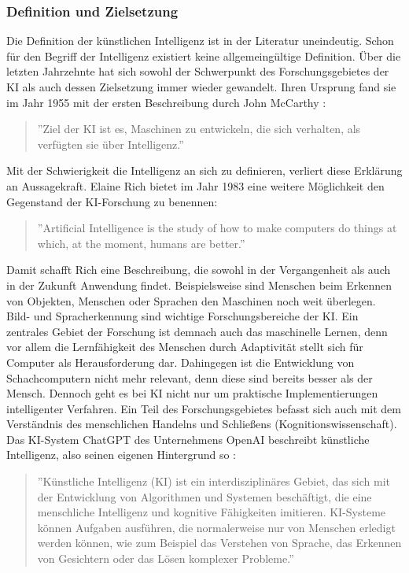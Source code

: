 \documentclass[a4paper,12pt, german]{report}
\begin{document}
\subsubsection{Definition und Zielsetzung}
Die Definition der künstlichen Intelligenz ist in der Literatur uneindeutig. Schon für den Begriff der Intelligenz existiert keine allgemeingültige Definition. Über die letzten Jahrzehnte hat sich sowohl der Schwerpunkt des Forschungsgebietes der KI als auch dessen Zielsetzung immer wieder gewandelt. Ihren Ursprung fand sie im Jahr 1955 mit der ersten Beschreibung durch John McCarthy \cite{11}:
\begin{quote}
  ''Ziel der KI ist es, Maschinen zu entwickeln, die sich verhalten, als verfügten sie über Intelligenz.''
\end{quote}
Mit der Schwierigkeit die Intelligenz an sich zu definieren, verliert diese Erklärung an Aussagekraft. Elaine Rich bietet im Jahr 1983 eine weitere Möglichkeit den Gegenstand der KI-Forschung zu benennen: 

\begin{quote}
''Artificial Intelligence is the study of how to make computers do things at which, at the moment, humans are better.''
\end{quote} 
Damit schafft Rich eine Beschreibung, die sowohl in der Vergangenheit als auch in der Zukunft Anwendung findet. Beispielsweise sind Menschen beim Erkennen von Objekten, Menschen oder Sprachen den Maschinen noch weit überlegen. Bild- und Spracherkennung sind wichtige Forschungsbereiche der KI. Ein zentrales Gebiet der Forschung ist demnach auch das maschinelle Lernen, denn vor allem die Lernfähigkeit des Menschen durch Adaptivität stellt sich für Computer als Herausforderung dar. Dahingegen ist die Entwicklung von Schachcomputern nicht mehr relevant, denn diese sind bereits besser als der Mensch. Dennoch geht es bei KI nicht nur um praktische Implementierungen intelligenter Verfahren. Ein Teil des Forschungsgebietes befasst sich auch mit dem Verständnis des menschlichen Handelns und Schließens (Kognitionswissenschaft). \cite{11} \newline
Das KI-System ChatGPT des Unternehmens OpenAI beschreibt künstliche Intelligenz, also seinen eigenen Hintergrund so \cite{04}:
\begin{quote}
  ''Künstliche Intelligenz (KI) ist ein interdisziplinäres Gebiet, das sich mit der Entwicklung von Algorithmen und Systemen beschäftigt, die eine menschliche Intelligenz und kognitive Fähigkeiten imitieren. KI-Systeme können Aufgaben ausführen, die normalerweise nur von Menschen erledigt werden können, wie zum Beispiel das Verstehen von Sprache, das Erkennen von Gesichtern oder das Lösen komplexer Probleme.''
\end{quote}
\end{document}
